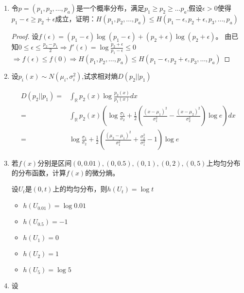 \documentclass[a4paper]{article}
\begin{document}
\begin{enumerate}[label=\thehwcnt.\arabic*.]
\begin{proof}
\begin{align*}
=& H(X)+H(Y)-H(X,Y)-(H(X,Z)-H(Z))+H(X,Y,Z)-H(Y,Z)\\
=& H(X,Y,Z)-H(X)-H(Y)-H(Z)+(H(X)+H(Y)-H(X,Y))\\
+&(H(Y)+H(Z)-H(Y,Z))+(H(Z)+H(X)-H(X,Z))\\
=& H(X,Y,Z)-H(X)-H(Y)-H(Z)+I(X;Y)+I(Y;Z)+I(Z;X)
\end{align*}
\end{proof}
\item 令$p=(p_1,p_2,\dots,p_a)$是一个概率分布，满足$p_1\geq p_2\geq \dots p_a$,假设$\epsilon >0 $使得$p_1-\epsilon \geq p_2+\epsilon$成立，证明：$H(p_1,p_2,\dots,p_a)
\leq H(p_1-\epsilon,p_2+\epsilon,p_3,\dots,p_a)$
\begin{proof}
设$f(\epsilon)=(p_1-\epsilon)\log(p_1-\epsilon)+(p_2+\epsilon)\log(p_2+\epsilon)$。
由已知$0\leq \epsilon \leq \frac{p_2-p_1}{2} \Rightarrow
f'(\epsilon)=\log\frac{p_2+\epsilon}{p_1-\epsilon}\leq 0$
$\Rightarrow f(\epsilon)\leq f(0)\Rightarrow H(p_1,p_2,\dots,p_a)\leq H(p_1-\epsilon,p_2+\epsilon,p_3,\dots,p_a)$
\end{proof}
\item 设$p_i(x)\sim N(\mu_i,\sigma_i^2)$,试求相对熵$D(p_2||p_1)$
\begin{solution}
\begin{align*}
D(p_2||p_1)=& \int_{\mathbb{R}} p_2(x) \log \frac{p_2(x)}{p_1(x)}dx\\
=& \int_{\mathbb{R}} p_2(x) \left(\log \frac{\sigma_1}{\sigma_2}+\frac{1}{2}(\frac{(x-\mu_1)^2}{\sigma_1^2}-\frac{(x-\mu_2)^2}{\sigma_2^2})\log e\right)dx\\
=& \log \frac{\sigma_1}{\sigma_2}
+ \frac{1}{2}\left(\frac{(\mu_2-\mu_1)^2}{\sigma_1^2} + \frac{\sigma_2^2}{\sigma_1^2} -1\right)\log e
\end{align*}
\end{solution}
\item 若$f(x)$分别是区间$(0,0.01),(0,0.5),(0,1),(0,2),(0,5)$上均匀分布的分布函数，计算$f(x)$的微分熵。
\begin{solution}
设$U_t$是$(0,t)$上的均匀分布，则$h(U_t)=\log t$
\begin{itemize}
\item $h(U_{0.01})=\log 0.01$
\item $h(U_{0.5})=-1$
\item $h(U_{1})=0$
\item $h(U_{2})=1$
\item $h(U_{5})=\log 5$
\end{itemize}
\end{solution}
\item 设

\end{enumerate}
\end{document}
